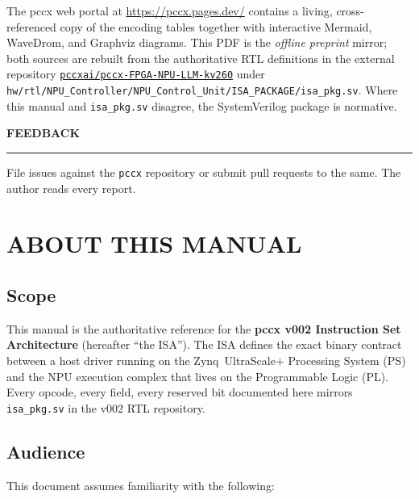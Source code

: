 \documentclass[11pt,a4paper,twoside,openany]{report}
\newcommand{\RefSection}[1]{%
  \par\medskip
  {\sffamily\bfseries\color{oceanblue}\normalsize\MakeUppercase{#1}}
  \par\vspace{-0.4em}
  {\color{oceanblue}\rule{\linewidth}{0.4pt}}\par\smallskip
}
\begin{document}
The pccx web portal at \url{https://pccx.pages.dev/}
contains a living, cross-referenced copy of the encoding tables
together with interactive Mermaid, WaveDrom, and Graphviz diagrams.
This PDF is the \textit{offline preprint} mirror; both sources
are rebuilt from the authoritative RTL definitions in the external
repository
\href{https://github.com/pccxai/pccx-FPGA-NPU-LLM-kv260}{\texttt{pccxai/pccx-FPGA-NPU-LLM-kv260}}
under
\texttt{hw/rtl/NPU\_Controller/NPU\_Control\_Unit/ISA\_PACKAGE/isa\_pkg.sv}.
Where this manual and \texttt{isa\_pkg.sv} disagree, the SystemVerilog
package is normative.

\RefSection{Feedback}

File issues against the \texttt{pccx} repository or submit pull
requests to the same. The author reads every report.

\newpage

\tableofcontents
\clearpage
\listoffigures
\clearpage

\setcounter{chapter}{0}

\chapter{ABOUT THIS MANUAL}

\section{Scope}

This manual is the authoritative reference for the \textbf{pccx v002
Instruction Set Architecture} (hereafter ``the ISA''). The ISA defines
the exact binary contract between a host driver running on the
Zynq~UltraScale+ Processing System (PS) and the NPU execution complex
that lives on the Programmable Logic (PL). Every opcode, every field,
every reserved bit documented here mirrors
\texttt{isa\_pkg.sv} in the v002 RTL repository.

\section{Audience}

This document assumes familiarity with the following:
\end{document}
